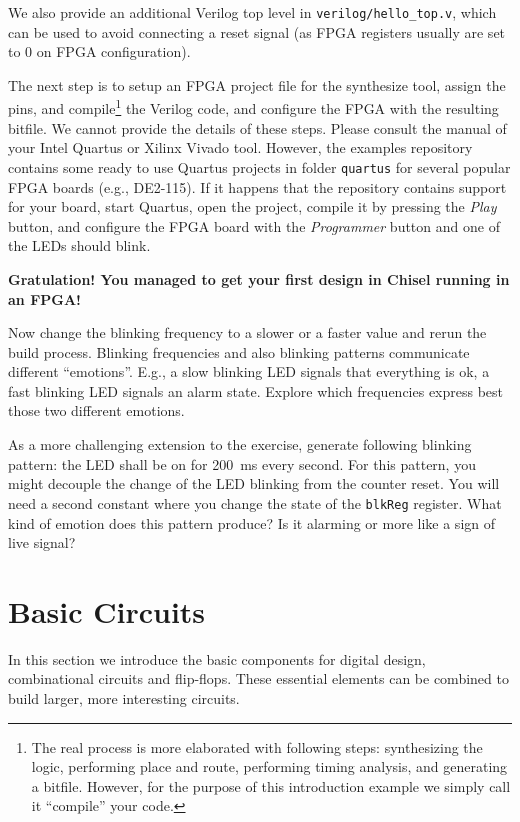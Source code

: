\documentclass[%
    10pt, %
    headinclude, footexclude,
    openright, %
    notitlepage,
    cleardoubleempty,
    headsepline,
    pointlessnumbers,
    bibtotoc, idxtotoc,
    ]{scrbook}
\newcommand{\code}[1]{{\small{\texttt{#1}}}}
\begin{document}
We also provide an additional Verilog top level in \code{verilog/hello\_top.v},
which can be used to avoid connecting a reset signal (as FPGA registers usually
are set to 0 on FPGA configuration).

The next step is to setup an FPGA project file for the synthesize tool, assign the pins,
and compile\footnote{The real process is more elaborated with following steps: synthesizing the logic,
performing place and route, performing timing analysis, and generating a bitfile.
However, for the purpose of this introduction example we simply call it ``compile''
your code.} the Verilog code, and configure the FPGA with the resulting bitfile.
We cannot provide the details of these steps. Please consult the manual of
your Intel Quartus or Xilinx Vivado tool.
However, the examples repository contains some ready to use Quartus
projects in folder \code{quartus} for several popular FPGA boards (e.g., DE2-115).
If it happens that the repository contains support for your board, start Quartus, open the project,
compile it by pressing the \emph{Play} button, and configure the FPGA board
with the \emph{Programmer} button and one of the LEDs should blink.

{\bf Gratulation! You managed to get your first design in Chisel running in an FPGA!}

Now change the blinking frequency to a slower or a faster value and
rerun the build process. Blinking frequencies and also blinking patterns
communicate different ``emotions''. E.g., a slow blinking LED signals that
everything is ok, a fast blinking LED signals an alarm state.
Explore which frequencies express best those two different emotions.

As a more challenging extension to the exercise, generate following blinking pattern:
the LED shall be on for 200~ms every second. For this pattern, you might
decouple the change of the LED blinking from the counter reset.
You will need a second constant where you change the state of the
\code{blkReg} register. What kind of emotion does this pattern produce?
Is it alarming or more like a sign of live signal?




\chapter{Basic Circuits}

In this section we introduce the basic components for digital design,
combinational circuits and flip-flops.
These essential elements can be combined to build larger, more interesting circuits.
\end{document}
